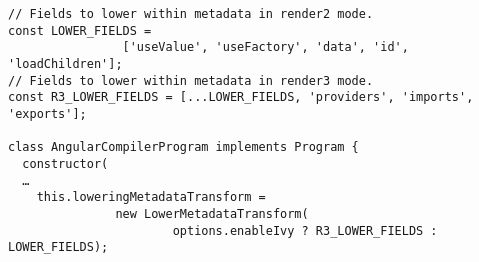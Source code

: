 \begin{verbatim}
// Fields to lower within metadata in render2 mode.
const LOWER_FIELDS =
                ['useValue', 'useFactory', 'data', 'id', 'loadChildren'];
// Fields to lower within metadata in render3 mode.
const R3_LOWER_FIELDS = [...LOWER_FIELDS, 'providers', 'imports', 'exports'];

class AngularCompilerProgram implements Program {
  constructor(
  …
    this.loweringMetadataTransform =
               new LowerMetadataTransform(
                       options.enableIvy ? R3_LOWER_FIELDS : LOWER_FIELDS);
\end{verbatim}
